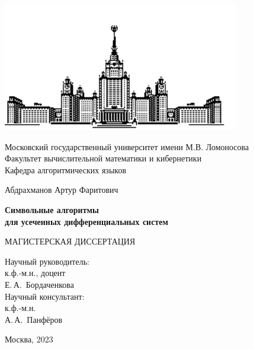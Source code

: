 \begin{titlepage}
    \begin{center}
        \includegraphics[scale=1]{титульник/msu-eps-converted-to.pdf}
        
        Московский государственный университет имени М.В. Ломоносова \\
        Факультет вычислительной математики и кибернетики \\
        Кафедра алгоритмических языков \\
        \vspace{1cm}

        \vspace{6em}

        Абдрахманов Артур Фаритович \\
    \end{center}

    \vspace{1.2em}

    \begin{center}
        \Large
        \textbf{Символьные алгоритмы \\
        для усеченных дифференциальных систем}
    \end{center}

    \vspace{5em}

    \begin{center}
        МАГИСТЕРСКАЯ ДИССЕРТАЦИЯ
    \end{center}
    
    \vspace{6em}

    \begin{flushright}
        Научный руководитель: \\
        к.ф.-м.н., доцент \\
        Е.\,А.~Бордаченкова \\
        \vspace{1em}
        Научный консультант: \\
        к.ф.-м.н. \\
        А.\,А.~Панфёров \\
    \end{flushright}

    \vspace{\fill}

    \begin{center}
        Москва, 2023
    \end{center}

\end{titlepage}